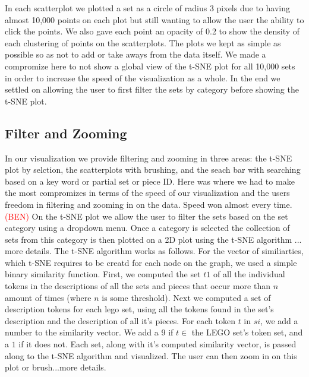 \documentclass[a4paper, 11pt]{article}
\begin{document}
In each scatterplot we plotted a set as a circle of radius 3 pixels  due to having almost 10,000 points on each plot but still wanting to allow the user the ability to click the points. We also gave each point an  opacity of 0.2 to show the density of each clustering of points on the scatterplots. The plots we kept as simple as possible so as not to add or take aways from the data itself. We made a compromize here to not show a global view of the t-SNE plot for all 10,000 sets in order to increase the speed of the visualization as a whole. In the end we settled on allowing the user to first filter the sets by category before showing the t-SNE plot.

\subsection*{Filter and Zooming}

In our visualization we provide filtering and zooming in three areas: the t-SNE plot by selction, the scatterplots with brushing, and the seach bar with searching based on a key word or partial set or piece ID. Here was where we had to make the most compromizes in terms of the speed of our visualization and the users freedom in filtering and zooming in on the data. Speed won almost every time.\\

\textcolor{red}{(BEN)} On the t-SNE plot we allow the user to filter the sets based on the set category using a dropdown menu. Once a category is selected the collection of sets from this category is then plotted on a 2D plot using the t-SNE algorithm ... more details. The t-SNE algorithm works as follows. For the vector of similiarties, which t-SNE requires to be creatd for each node on the graph, we used a simple binary similarity function. First, we computed the set $t1$ of all the individual tokens in the descriptions of all the sets and pieces that occur more than $n$ amount of times (where $n$ is some threshold). Next we computed a set of description tokens for each lego set, using all the tokens found in the set's description and the description of all it's pieces. For each token $t$ in $si$, we add a number to the similarity vector. We add a 9 if $t \in$ the LEGO set's token set, and a $1$ if it does not. Each set, along with it's computed similarity vector, is passed along to the t-SNE algorithm and visualized.
The user can then zoom in on this plot or brush...more details.\\
\end{document}
